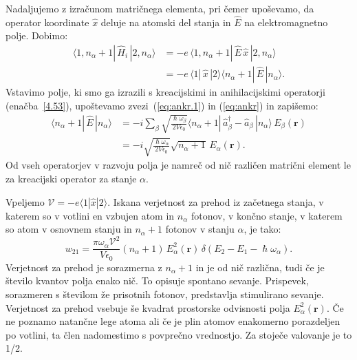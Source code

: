 Nadaljujemo z izračunom matričnega elementa, pri čemer upoševamo, da operator koordinate
$\hat{x}$ deluje na atomski del stanja in $\hat{E}$ na elektromagnetno
polje. Dobimo:
\begin{align}
\langle1,n_{\alpha}+1|\,\hat{H}_{i}\,|2,n_{\alpha}\rangle & =  -e\,
\langle1,n_{\alpha}+1|\,\hat{E}\,\hat{x}\,|2,n_{\alpha}\rangle \nonumber\\
 & =  -e\,\langle1|\,\hat{x}\,|2\rangle\langle n_{\alpha}+1|\,\hat{E}\,|n_{\alpha}\rangle.
\end{align}
Vstavimo polje, ki smo ga izrazili s kreacijskimi in anihilacijskimi operatorji (enačba~\ref{4.53}),
upoštevamo zvezi~(\ref{eq:ankr.1}) in (\ref{eq:ankr}) in zapišemo:
\begin{align}
\langle n_{\alpha}+1|\, \hat{E}\,|n_{\alpha}\rangle & = 
 -i\sum_{\beta}\sqrt{\frac{\hslash\omega_{\beta}}{2V\epsilon_{0}}}
\langle n_{\alpha}+1|\,\hat{a}_{\beta}^{\dagger}-\hat{a}_{\beta}\,|n_{\alpha}\rangle\, 
E_{\beta}(\mathbf{r})\nonumber \\
 & =  -i\sqrt{\frac{\hslash\omega_{\alpha}}{2V\epsilon_{0}}}
 \sqrt{n_{\alpha}+1}\, E_{\alpha}(\mathbf{r}).
\end{align}
Od vseh operatorjev v razvoju polja je namreč od nič različen matrični
element le za kreacijski operator za stanje $\alpha$.

Vpeljemo $\mathcal{V} = -e \langle1|\hat{x}|2\rangle$.
 Iskana verjetnost za prehod iz 
začetnega stanja, v katerem so v votlini en vzbujen atom in $n_{\alpha}$ fotonov, v končno
stanje, v katerem so atom v osnovnem stanju in $n_{\alpha}+1$ fotonov v stanju $\alpha$, je tako:
\begin{equation}
w_{21}=\frac{\pi \omega_{\alpha}\mathcal{V}^{2}}{V\epsilon_{0}}
(n_{\alpha}+1)\,E_{\alpha}^{2}(\mathbf{r})\,\delta(E_{2}-E_{1}-\hslash\omega_{\alpha}).
\label{4.56}
\end{equation}
Verjetnost za prehod je sorazmerna z $n_{\alpha}+1$ in je od nič
različna, tudi če je število kvantov polja enako nič. To opisuje 
spontano sevanje. Prispevek, sorazmeren 
s številom že prisotnih fotonov, predstavlja stimulirano 
sevanje. Verjetnost za prehod vsebuje
še kvadrat prostorske odvisnosti polja $E_{\alpha}^{2}(\mathbf{r})$.
Če ne poznamo natančne lege atoma ali če je plin atomov enakomerno
porazdeljen po votlini, ta člen nadomestimo s povprečno vrednostjo.
Za stoječe valovanje je to 1/2.

